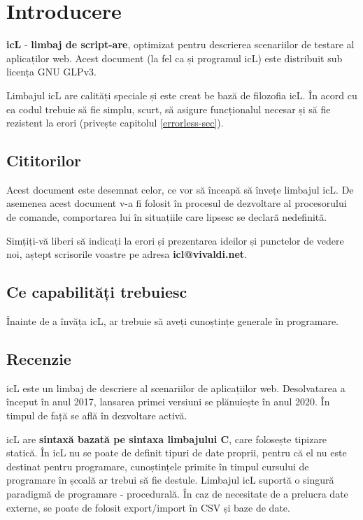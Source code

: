\section{Introducere}

\indent \textbf{icL} - \textbf{limbaj de script-are}, optimizat pentru descrierea scenariilor de testare al aplicaților web. Acest document (la fel ca și programul icL) este distribuit sub licența GNU GLPv3.

Limbajul icL are calități speciale și este creat be bază de filozofia icL. În acord cu ea codul trebuie să fie simplu, scurt, să asigure funcționalul necesar și să fie rezistent la erori (privește capitolul \ref{errorless-sec}).

\subsection{Cititorilor}

Acest document este desemnat celor, ce vor să înceapă să învețe limbajul icL. De asemenea acest document v-a fi folosit în procesul de dezvoltare al procesorului de comande, comportarea lui în situațiile care lipsesc se declară nedefinită.

Simțiți-vă liberi să indicați la erori și prezentarea ideilor și punctelor de vedere noi, aștept scrisorile voastre pe adresa {\bf icl@vivaldi.net}.

\subsection{Ce capabilități trebuiesc}

Înainte de a învăța icL, ar trebuie să aveți cunoștințe generale în programare.

\subsection{Recenzie}

icL este un limbaj de descriere al scenariilor de aplicațiilor web. Desolvatarea a început în anul 2017, lansarea primei versiuni se plănuiește în anul 2020. În timpul de față se află în dezvoltare activă.

icL are \textbf{sintaxă bazată pe sintaxa limbajului C}, care folosește tipizare statică. În icL nu se poate de definit tipuri de date proprii, pentru că el nu este destinat pentru programare, cunoștințele primite în timpul cursului de programare în școală ar trebui să fie destule. Limbajul icL suportă o singură paradigmă de programare - procedurală. În caz de necesitate de a prelucra date externe, se poate de folosit export/import în CSV și baze de date.

